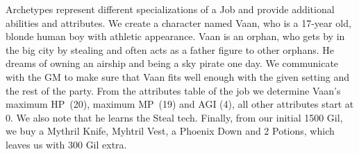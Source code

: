 Archetypes represent different specializations of a Job and provide additional abilities and attributes.
%
\vfill
%
{
We create a character named Vaan, who is a 17-year old, blonde human boy with athletic appearance. 
Vaan is an orphan, who gets by in the big city by stealing and often acts as a father figure to other orphans.
He dreams of owning an airship and being a sky pirate one day. 
We communicate with the GM to make sure that Vaan fits well enough with the given setting and the rest of the party.
From the attributes table of the job we determine Vaan's maximum HP~(20), maximum MP~(19) and AGI (4), all other attributes start at 0.
We also note that he learns the Steal tech.
Finally, from our initial 1500 Gil, we buy a Mythril Knife, Myhtril Vest, a Phoenix Down and 2 Potions, which leaves us with 300 Gil extra.
}
%
%
\clearpage